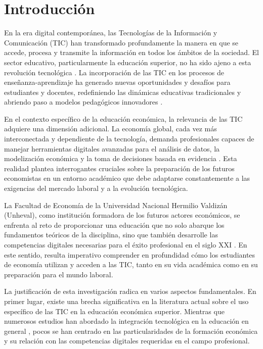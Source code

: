 \documentclass[12pt, a4paper]{article}
\begin{document}
\tableofcontents
\newpage

\section{Introducción}

En la era digital contemporánea, las Tecnologías de la Información y Comunicación (TIC) han transformado profundamente la manera en que se accede, procesa y transmite la información en todos los ámbitos de la sociedad. El sector educativo, particularmente la educación superior, no ha sido ajeno a esta revolución tecnológica \parencite{Castells2010}. La incorporación de las TIC en los procesos de enseñanza-aprendizaje ha generado nuevas oportunidades y desafíos para estudiantes y docentes, redefiniendo las dinámicas educativas tradicionales y abriendo paso a modelos pedagógicos innovadores \parencite{Selwyn2016}.

En el contexto específico de la educación económica, la relevancia de las TIC adquiere una dimensión adicional. La economía global, cada vez más interconectada y dependiente de la tecnología, demanda profesionales capaces de manejar herramientas digitales avanzadas para el análisis de datos, la modelización económica y la toma de decisiones basada en evidencia \parencite{Becker2019}. Esta realidad plantea interrogantes cruciales sobre la preparación de los futuros economistas en un entorno académico que debe adaptarse constantemente a las exigencias del mercado laboral y a la evolución tecnológica.

La Facultad de Economía de la Universidad Nacional Hermilio Valdizán (Unheval), como institución formadora de los futuros actores económicos, se enfrenta al reto de proporcionar una educación que no solo abarque los fundamentos teóricos de la disciplina, sino que también desarrolle las competencias digitales necesarias para el éxito profesional en el siglo XXI \parencite{Fichman2014}. En este sentido, resulta imperativo comprender en profundidad cómo los estudiantes de economía utilizan y acceden a las TIC, tanto en su vida académica como en su preparación para el mundo laboral.

La justificación de esta investigación radica en varios aspectos fundamentales. En primer lugar, existe una brecha significativa en la literatura actual sobre el uso específico de las TIC en la educación económica superior. Mientras que numerosos estudios han abordado la integración tecnológica en la educación en general \parencite{Tondeur2017}, pocos se han centrado en las particularidades de la formación económica y su relación con las competencias digitales requeridas en el campo profesional.
\end{document}
